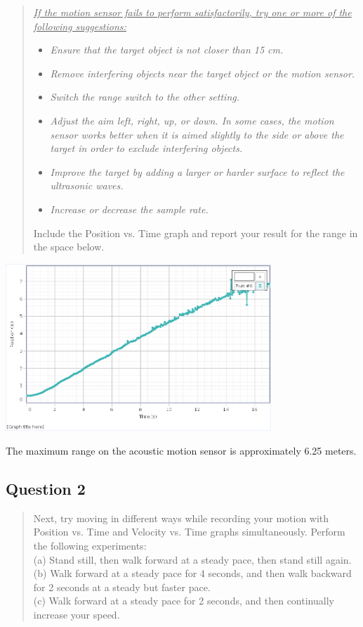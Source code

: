 \documentclass[8pt]{extarticle}
\begin{document}
{\begin{quote}
	\textit{\underline{If the motion sensor fails to perform satisfactorily, try one or more of the following suggestions:}}
	\begin{itemize}
		\item \textit{Ensure that the target object is not closer than 15 cm.}
		\item \textit{Remove interfering objects near the target object or the motion sensor.}
		\item \textit{Switch the range switch to the other setting.}
		\item \textit{Adjust the aim left, right, up, or down.  In some cases, the motion sensor works better when it is aimed slightly to the side or above the target in order to exclude interfering objects.}
		\item \textit{Improve the target by adding a larger or harder surface to reflect the ultrasonic waves.}
		\item \textit{Increase or decrease the sample rate.}
	\end{itemize}
	Include the Position vs. Time graph and report your result for the range in the space below.
\end{quote}
\begin{center}
	\includegraphics[width=10cm]{Lab2Image1_1}
\end{center}
The maximum range on the acoustic motion sensor is approximately 6.25 meters.
\subsection*{Question 2}
\begin{quote}
	Next, try moving in different ways while recording your motion with Position vs. Time and Velocity vs. Time graphs simultaneously.  Perform the following experiments: \\
	(a) Stand still, then walk forward at a steady pace, then stand still again. \\
	(b) Walk forward at a steady pace for 4 seconds, and then walk backward for 2 seconds at a steady but faster pace. \\
	(c) Walk forward at a steady pace for 2 seconds, and then continually increase your speed. \\
	

\end{quote}}
\end{document}
